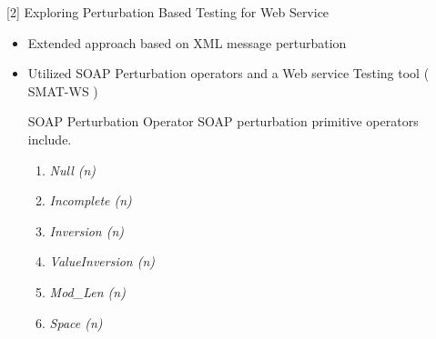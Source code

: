 \documentclass{bredelebeamer}
\begin{document}
%
%	
%			
%			
%			
%			
%	


\begin{frame}{[2] Exploring Perturbation Based Testing for Web
		Service}
	\begin{itemize}
		\large
		\item Extended approach based on XML message perturbation
		\newline
		\item Utilized SOAP Perturbation operators and a Web service Testing
		tool ( SMAT-WS )
		\newline
		\begin{block}{SOAP Perturbation Operator}
			SOAP perturbation primitive operators include.
			\begin{enumerate}
				\large
				\item  \textit{Null (n)}
				\item \textit{Incomplete (n)}
				\item \textit{Inversion (n)}
				\item \textit{ValueInversion (n)}
				\item \textit{Mod\_Len (n)}
				\item \textit{Space (n)}
				
			\end{enumerate}   
		\end{block}
	\end{itemize}
\end{frame}
\end{document}

